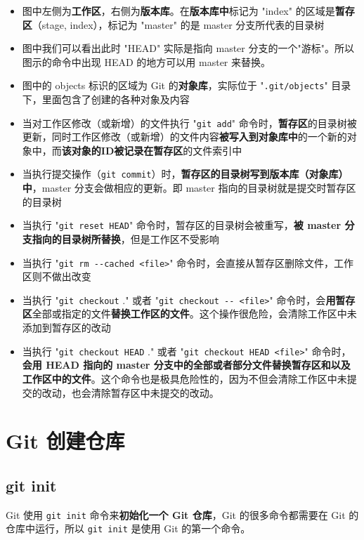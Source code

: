 \documentclass[UTF8,a4paper,12pt]{ctexbook}
\begin{document}
		  \begin{itemize}
		  	\item 图中左侧为\textbf{工作区}，右侧为\textbf{版本库}。在\textbf{版本库中}标记为 "index" 的区域是\textbf{暂存区}（stage, index），标记为 "master" 的是 master 分支所代表的目录树
		  	
		  	\item 图中我们可以看出此时 "HEAD" 实际是指向 master 分支的一个"游标"。所以图示的命令中出现 HEAD 的地方可以用 master 来替换。
		  	
		  	\item 图中的 objects 标识的区域为 Git 的\textbf{对象库}，实际位于 "\verb|.git/objects|" 目录下，里面包含了创建的各种对象及内容
		  	\item 当对工作区修改（或新增）的文件执行 "\verb|git add|" 命令时，\textbf{暂存区}的目录树被更新，同时工作区修改（或新增）的文件内容\textbf{被写入到对象库中}的一个新的对象中，而\textbf{该对象的ID被记录在暂存区}的文件索引中
		  	
		  	\item 当执行提交操作（\verb|git commit|）时，\textbf{暂存区的目录树写到版本库（对象库）中}，master 分支会做相应的更新。即 master 指向的目录树就是提交时暂存区的目录树
		  	
		  	\item 当执行 "\verb|git reset HEAD|" 命令时，暂存区的目录树会被重写，\textbf{被 master 分支指向的目录树所替换}，但是工作区不受影响
		  	
		  	\item 当执行 "\verb|git rm --cached <file>|" 命令时，会直接从暂存区删除文件，工作区则不做出改变
		  	\item 当执行 "\verb|git checkout| ." 或者 "\verb|git checkout -- <file>|" 命令时，会\textbf{用暂存区}全部或指定的文件\textbf{替换工作区的文件}。这个操作很危险，会清除工作区中未添加到暂存区的改动
		  	
		  	\item 当执行 "\verb|git checkout HEAD| ." 或者 "\verb|git checkout HEAD <file>|" 命令时，\textbf{会用 HEAD 指向的 master 分支中的全部或者部分文件替换暂存区和以及工作区中的文件}。这个命令也是极具危险性的，因为不但会清除工作区中未提交的改动，也会清除暂存区中未提交的改动。 
		  \end{itemize}
  \chapter{Git 创建仓库}
	\section{git init}
		  Git 使用 \verb|git init| 命令来\textbf{初始化一个 Git 仓库}，Git 的很多命令都需要在 Git 的仓库中运行，所以 \verb|git init| 是使用 Git 的第一个命令。
		  
\end{document}
